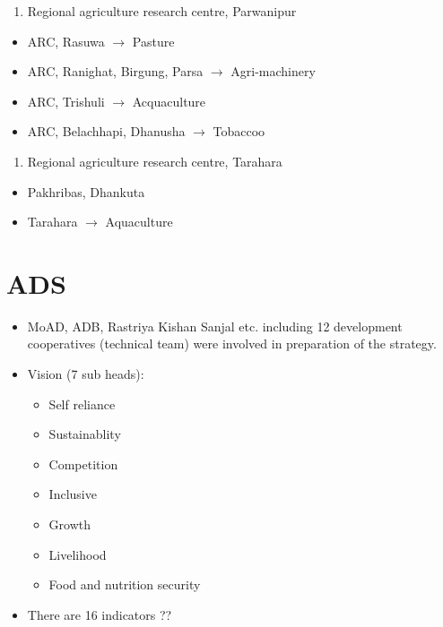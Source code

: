 \documentclass[
  openany]{book}
\providecommand{\tightlist}{%
  \setlength{\itemsep}{0pt}\setlength{\parskip}{0pt}}
\begin{document}
\begin{enumerate}
\def\labelenumi{\arabic{enumi}.}
\setcounter{enumi}{2}
\tightlist
\item
  Regional agriculture research centre, Parwanipur
\end{enumerate}

\begin{itemize}
\tightlist
\item
  ARC, Rasuwa \(\rightarrow\) Pasture
\item
  ARC, Ranighat, Birgung, Parsa \(\rightarrow\) Agri-machinery
\item
  ARC, Trishuli \(\rightarrow\) Acquaculture
\item
  ARC, Belachhapi, Dhanusha \(\rightarrow\) Tobaccoo
\end{itemize}

\begin{enumerate}
\def\labelenumi{\arabic{enumi}.}
\setcounter{enumi}{3}
\tightlist
\item
  Regional agriculture research centre, Tarahara
\end{enumerate}

\begin{itemize}
\tightlist
\item
  Pakhribas, Dhankuta
\item
  Tarahara \(\rightarrow\) Aquaculture
\end{itemize}

\hypertarget{ads}{%
\section{ADS}\label{ads}}

\begin{itemize}
\tightlist
\item
  MoAD, ADB, Rastriya Kishan Sanjal etc. including 12 development cooperatives (technical team) were involved in preparation of the strategy.
\item
  Vision (7 sub heads):

  \begin{itemize}
  \tightlist
  \item
    Self reliance
  \item
    Sustainablity
  \item
    Competition
  \item
    Inclusive
  \item
    Growth
  \item
    Livelihood
  \item
    Food and nutrition security
  \end{itemize}
\item
  There are 16 indicators ??
\end{itemize}
\end{document}

